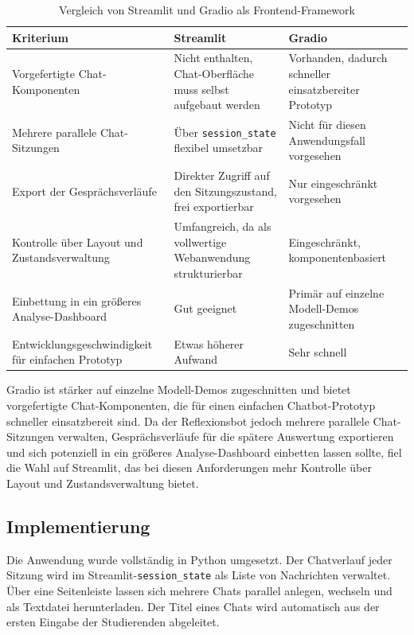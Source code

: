 \begin{table}[htb]
\centering
\caption{Vergleich von Streamlit und Gradio als Frontend-Framework}
\label{tab:streamlit-gradio}
\renewcommand{\arraystretch}{1.3}
\setlength{\tabcolsep}{8pt}
\begin{tabular}{>{\raggedright\arraybackslash}p{}
                >{\raggedright\arraybackslash}p{}
                >{\raggedright\arraybackslash}p{}}
\toprule
\textbf{Kriterium} & \textbf{Streamlit} & \textbf{Gradio} \\
\midrule
Vorgefertigte Chat-Komponenten &
Nicht enthalten, Chat-Oberfläche muss selbst aufgebaut werden &
Vorhanden, dadurch schneller einsatzbereiter Prototyp \\
\midrule
Mehrere parallele Chat-Sitzungen &
Über \texttt{session\_state} flexibel umsetzbar &
Nicht für diesen Anwendungsfall vorgesehen \\
\midrule
Export der Gesprächsverläufe &
Direkter Zugriff auf den Sitzungszustand, frei exportierbar &
Nur eingeschränkt vorgesehen \\
\midrule
Kontrolle über Layout und Zustandsverwaltung &
Umfangreich, da als vollwertige Webanwendung strukturierbar &
Eingeschränkt, komponentenbasiert \\
\midrule
Einbettung in ein größeres Analyse-Dashboard &
Gut geeignet &
Primär auf einzelne Modell-Demos zugeschnitten \\
\midrule
Entwicklungs\-geschwindig\-keit für einfachen Prototyp &
Etwas höherer Aufwand &
Sehr schnell \\
\bottomrule
\end{tabular}
\end{table}

Gradio ist stärker auf einzelne Modell-Demos zugeschnitten und bietet vorgefertigte
Chat-Komponenten, die für einen einfachen Chatbot-Prototyp schneller einsatzbereit sind. Da der
Reflexionsbot jedoch mehrere parallele Chat-Sitzungen verwalten, Gesprächsverläufe für die
spätere Auswertung exportieren und sich potenziell in ein größeres Analyse-Dashboard einbetten
lassen sollte, fiel die Wahl auf Streamlit, das bei diesen Anforderungen mehr Kontrolle über
Layout und Zustandsverwaltung bietet.

\subsection{Implementierung}
Die Anwendung wurde vollständig in Python umgesetzt. Der Chatverlauf jeder Sitzung wird im
Streamlit-\texttt{session\_state} als Liste von Nachrichten verwaltet. Über eine Seitenleiste
lassen sich mehrere Chats parallel anlegen, wechseln und als Textdatei herunterladen. Der
Titel eines Chats wird automatisch aus der ersten Eingabe der Studierenden abgeleitet.

